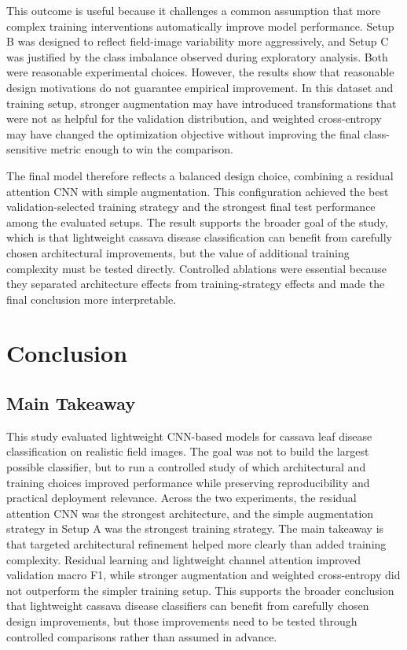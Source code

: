\documentclass[11pt]{article}
\begin{document}
This outcome is useful because it challenges a common assumption that more complex training interventions automatically improve model performance. Setup B was designed to reflect field-image variability more aggressively, and Setup C was justified by the class imbalance observed during exploratory analysis. Both were reasonable experimental choices. However, the results show that reasonable design motivations do not guarantee empirical improvement. In this dataset and training setup, stronger augmentation may have introduced transformations that were not as helpful for the validation distribution, and weighted cross-entropy may have changed the optimization objective without improving the final class-sensitive metric enough to win the comparison.

The final model therefore reflects a balanced design choice, combining a residual attention CNN with simple augmentation. This configuration achieved the best validation-selected training strategy and the strongest final test performance among the evaluated setups. The result supports the broader goal of the study, which is that lightweight cassava disease classification can benefit from carefully chosen architectural improvements, but the value of additional training complexity must be tested directly. Controlled ablations were essential because they separated architecture effects from training-strategy effects and made the final conclusion more interpretable.


\section{Conclusion}

\subsection{Main Takeaway}

This study evaluated lightweight CNN-based models for cassava leaf disease classification on realistic field images. The goal was not to build the largest possible classifier, but to run a controlled study of which architectural and training choices improved performance while preserving reproducibility and practical deployment relevance. Across the two experiments, the residual attention CNN was the strongest architecture, and the simple augmentation strategy in Setup A was the strongest training strategy. The main takeaway is that targeted architectural refinement helped more clearly than added training complexity. Residual learning and lightweight channel attention improved validation macro F1, while stronger augmentation and weighted cross-entropy did not outperform the simpler training setup. This supports the broader conclusion that lightweight cassava disease classifiers can benefit from carefully chosen design improvements, but those improvements need to be tested through controlled comparisons rather than assumed in advance.
\end{document}
